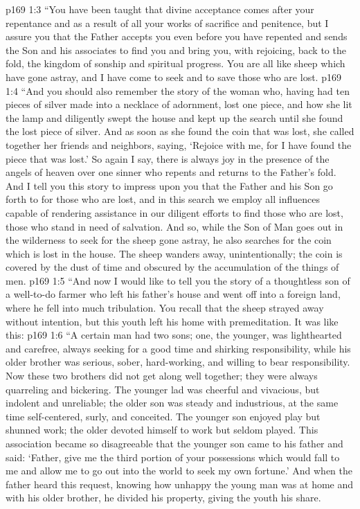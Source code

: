 \vs p169 1:3 \textcolor{ubdarkred}{“You have been taught that divine acceptance comes after your repentance and as a result of all your works of sacrifice and penitence, but I assure you that the Father accepts you even before you have repented and sends the Son and his associates to find you and bring you, with rejoicing, back to the fold, the kingdom of sonship and spiritual progress. You are all like sheep which have gone astray, and I have come to seek and to save those who are lost.}
\vs p169 1:4 \textcolor{ubdarkred}{“And you should also remember the story of the woman who, having had ten pieces of silver made into a necklace of adornment, lost one piece, and how she lit the lamp and diligently swept the house and kept up the search until she found the lost piece of silver. And as soon as she found the coin that was lost, she called together her friends and neighbors, saying, ‘Rejoice with me, for I have found the piece that was lost.’ So again I say, there is always joy in the presence of the angels of heaven over one sinner who repents and returns to the Father’s fold. And I tell you this story to impress upon you that the Father and his Son go forth to  for those who are lost, and in this search we employ all influences capable of rendering assistance in our diligent efforts to find those who are lost, those who stand in need of salvation. And so, while the Son of Man goes out in the wilderness to seek for the sheep gone astray, he also searches for the coin which is lost in the house. The sheep wanders away, unintentionally; the coin is covered by the dust of time and obscured by the accumulation of the things of men.}
\vs p169 1:5 \textcolor{ubdarkred}{“And now I would like to tell you the story of a thoughtless son of a well\hyp{}to\hyp{}do farmer who  left his father’s house and went off into a foreign land, where he fell into much tribulation. You recall that the sheep strayed away without intention, but this youth left his home with premeditation. It was like this:}
\vs p169 1:6 \pc \textcolor{ubdarkred}{“A certain man had two sons; one, the younger, was lighthearted and carefree, always seeking for a good time and shirking responsibility, while his older brother was serious, sober, hard\hyp{}working, and willing to bear responsibility. Now these two brothers did not get along well together; they were always quarreling and bickering. The younger lad was cheerful and vivacious, but indolent and unreliable; the older son was steady and industrious, at the same time self\hyp{}centered, surly, and conceited. The younger son enjoyed play but shunned work; the older devoted himself to work but seldom played. This association became so disagreeable that the younger son came to his father and said: ‘Father, give me the third portion of your possessions which would fall to me and allow me to go out into the world to seek my own fortune.’ And when the father heard this request, knowing how unhappy the young man was at home and with his older brother, he divided his property, giving the youth his share.}
